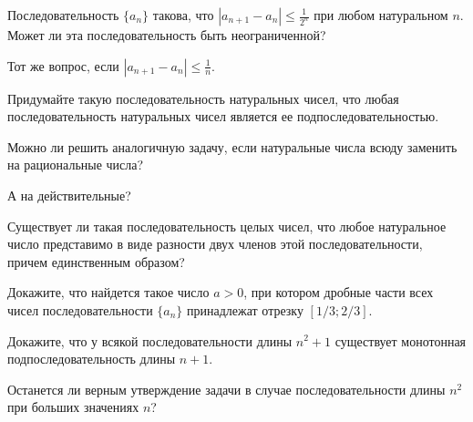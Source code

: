 \documentclass[a4paper, 12pt, num=25]{listok}
\begin{document}
\begin{problem}
\begin{probparts}
	\item Последовательность $\{a_n\}$ такова, что $|a_{n+1} - a_n| \le \frac1{2^n}$ при любом натуральном $n$.
	Может ли эта последовательность быть неограниченной?
	\item Тот же вопрос, если $|a_{n+1} - a_n| \le \frac1n$.
\end{probparts}
\end{problem}
\begin{problem}
\begin{probparts}
	\item Придумайте такую последовательность натуральных чисел, что любая последовательность натуральных чисел является ее подпоследовательностью.
	\item Можно ли решить аналогичную задачу, если натуральные числа всюду заменить на рациональные числа?
	\item А на действительные?
\end{probparts}
\end{problem}
\begin{problem}
	Существует ли такая последовательность целых чисел, что любое натуральное число представимо в виде разности двух членов этой последовательности,
	причем единственным образом?
\end{problem}
\begin{problem}
	Докажите, что найдется такое число $a > 0$,
	при котором дробные части всех чисел последовательности $\{a_n\}$ принадлежат отрезку $[1/3; 2/3]$.
\end{problem}
\begin{problem}
\begin{probparts}
	\item Докажите, что у всякой последовательности длины $n^2 + 1$ существует монотонная подпоследовательность длины $n + 1$.
	\item Останется ли верным утверждение задачи в случае последовательности длины $n^2$ при больших значениях $n$?
\end{probparts}
\end{problem}
\end{document}
